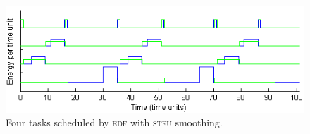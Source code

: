 \begin{figure}[htb]
\includegraphics[scale=0.64]{stfutasks.png}
\caption{Four tasks scheduled by \textsc{edf} with \textsc{stfu} smoothing.\label{fig:stfutaskplot}}

\end{figure}




































